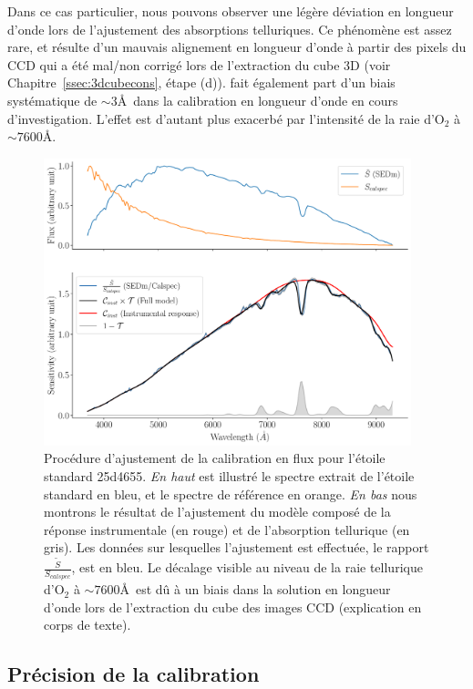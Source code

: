 \documentclass[../main/main.tex]{subfiles}
\begin{document}
Dans ce cas particulier, nous pouvons
observer une légère déviation en longueur d'onde lors de l'ajustement
des absorptions telluriques. Ce phénomène est assez rare, et résulte
d'un mauvais alignement en longueur d'onde
à partir des pixels du CCD qui a été mal/non
corrigé lors de l'extraction du cube 3D (voir
Chapitre~\ref{ssec:3dcubecons}, étape (d)). \citet{pysedm} fait
également part d'un biais systématique de $\sim3$\AA\ dans la
calibration en longueur d'onde en cours d'investigation. L'effet est d'autant plus
exacerbé par l'intensité de la raie d'O$_{2}$ à $\sim7600$\AA.

\begin{figure}[ht]
  \centering
  \includegraphics[width=0.95\textwidth]{../figures/06_irf/calibmodel.pdf}
  \caption[Procédure d'ajustement de la calibration en flux]{Procédure
    d'ajustement de la calibration en flux pour l'étoile standard
    25d4655. \emph{En haut} est illustré le spectre extrait de l'étoile
    standard en bleu, et le spectre de référence en orange. \emph{En
      bas} nous montrons le résultat de l'ajustement du modèle composé
    de la réponse instrumentale (en rouge) et de l'absorption tellurique
  (en gris). Les données sur lesquelles l'ajustement est effectuée, le
  rapport $\frac{\tilde{S}}{S_{calspec}}$, est en bleu. Le décalage
  visible au niveau de la raie tellurique d'O$_{2}$ à $\sim7600$\AA\ est
dû à un biais dans la solution en longueur d'onde lors de l'extraction
du cube des images CCD (explication en corps de texte).}
  \label{fig:calibmodel}
\end{figure}

\subsection{Précision de la calibration}\label{ssec:resultscalib}
\end{document}
